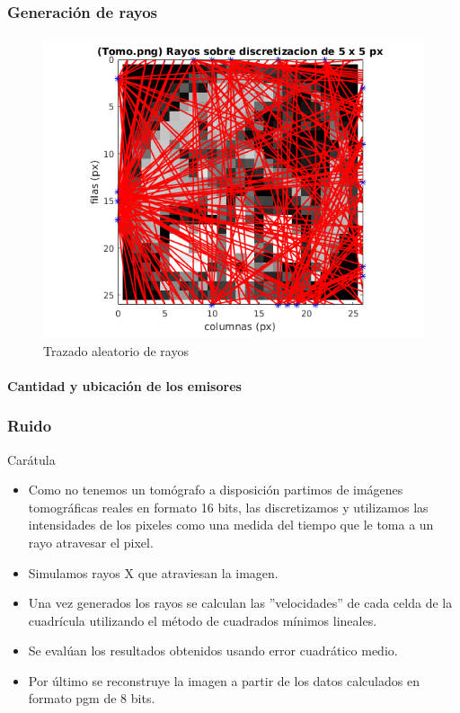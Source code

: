 \documentclass[11pt]{beamer}
\begin{document}
\begin{frame}
\frametitle{Generación de rayos}
\begin{figure}[H] 
\centering
\includegraphics[width=1\textwidth]{img/rayos_tomo25x25px.png}
\caption{Trazado aleatorio de rayos}
\label{fig:rayos aleatorios}
\end{figure}

\framesubtitle{Cantidad y ubicación de los emisores}

\end{frame}


\begin{frame}
\frametitle{Ruido}
\end{frame}


\begin{frame}

\end{frame}


\begin{frame}{Carátula}
\begin{itemize}

\item Como no tenemos un tomógrafo a disposición partimos de imágenes tomográficas reales en formato 16 bits, las discretizamos y utilizamos las intensidades de los pixeles como una medida del tiempo que le toma a un rayo atravesar el pixel.
\item Simulamos rayos X que atraviesan la imagen.
\item Una vez generados los rayos se calculan las ''velocidades'' de cada celda de la cuadrícula utilizando el método de cuadrados mínimos lineales. \item Se evalúan los resultados obtenidos usando error cuadrático medio.
\item Por último se reconstruye la imagen a partir de los datos calculados en formato pgm de 8 bits.
\end{itemize}
\end{frame}
\end{document}
